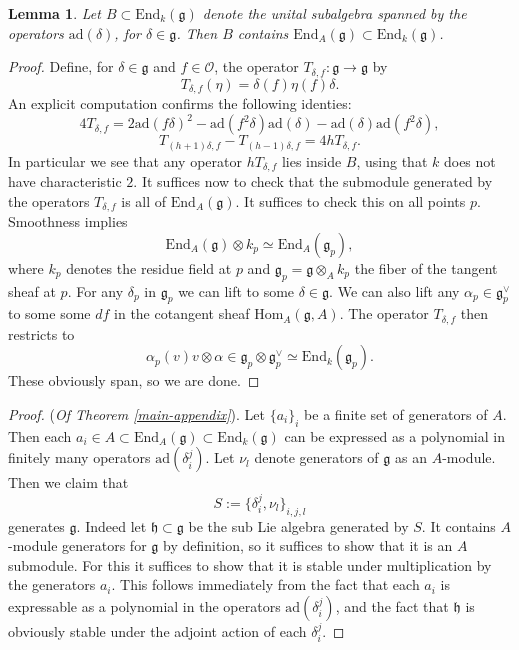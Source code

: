 \documentclass[12pt, oneside]{amsart}       %
\newtheorem{lemma}[theorem]{Lemma}
\theoremstyle{remark}
\newcommand{\OO}{\mathcal{O}}
\newcommand{\dl}{^{\vee}}
\newcommand{\g}{\mathfrak{g}}
\begin{document}
\begin{lemma} Let $B\subset\mathrm{End}_k(\g)$ denote the unital subalgebra spanned by the operators $\mathrm{ad}(\delta)$, for $\delta\in\g$. Then $B$ contains $\mathrm{End}_A(\g)\subset\mathrm{End}_k(\g)$. \end{lemma}
\begin{proof}
Define, for $\delta\in\g$ and $f\in \OO$, the operator $T_{\delta,f}:\g\to\g$ by $$T_{\delta,f}(\eta)=\delta(f)\eta(f)\delta.$$ An explicit computation confirms the following identies: $$4T_{\delta,f}=2\mathrm{ad}(f\delta)^2-\mathrm{ad}(f^2\delta)\mathrm{ad}(\delta)-\mathrm{ad}(\delta)\mathrm{ad}(f^2\delta),$$ $$T_{(h+1)\delta,f}-T_{(h-1)\delta,f}=4hT_{\delta,f}.$$ In particular we see that any operator $hT_{\delta,f}$ lies inside $B$, using that $k$ does not have characteristic $2$. It suffices now to check that the submodule generated by the operators $T_{\delta,f}$ is all of $\mathrm{End}_A(\g)$. It suffices to check this on all points $p$. Smoothness implies $$\mathrm{End}_A(\g)\otimes k_p\simeq\mathrm{End}_A(\g_p),$$ where $k_p$ denotes the residue field at $p$ and $\g_p=\g\otimes_Ak_p$ the fiber of the tangent sheaf at $p$. For any $\delta_p$ in $\g_p$ we can lift to some $\delta\in\g$. We can also lift any $\alpha_p\in \g_p\dl$ to some some $df$ in the cotangent sheaf $\mathrm{Hom}_A(\g,A)$. The operator $T_{\delta,f}$ then restricts to $$\alpha_p(v)v\otimes\alpha\in \g_p\otimes\g_p\dl\simeq\mathrm{End}_k(\g_p).$$ These obviously span, so we are done.
\end{proof}
\begin{proof} (\emph{Of Theorem \ref{main-appendix}}). Let $\{a_i\}_i$ be a finite set of generators of $A$. Then each $a_i\in A\subset\mathrm{End}_A(\g)\subset\mathrm{End}_k(\g)$ can be expressed as a polynomial in finitely many operators $\mathrm{ad}(\delta_i^j)$. Let $\nu_l$ denote generators of $\g$ as an $A$-module. Then we claim that $$S:=\{\delta_i^j,\nu_l\}_{i,j,l}$$ generates $\g$. Indeed let $\mathfrak{h}\subset\g$ be the sub Lie algebra generated by $S$. It contains $A$-module generators for $\g$ by definition, so it suffices to show that it is an $A$ submodule. For this it suffices to show that it is stable under multiplication by the generators $a_i$. This follows immediately from the fact that each $a_i$ is expressable as a polynomial in the operators $\mathrm{ad}(\delta_i^j)$, and the fact that $\mathfrak{h}$ is obviously stable under the adjoint action of each $\delta_i^j$. \end{proof}
\end{document}
